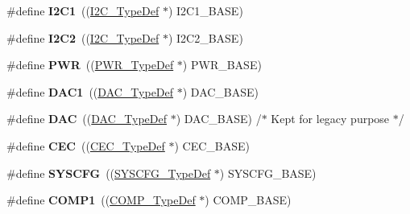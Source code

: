 \begin{DoxyCompactItemize}
\#define {\bfseries I2\+C1}~((\hyperlink{struct_i2_c___type_def}{I2\+C\+\_\+\+Type\+Def} $\ast$) I2\+C1\+\_\+\+B\+A\+SE)
\item 
\mbox{\label{group___peripheral__declaration_gafa60ac20c1921ef1002083bb3e1f5d16}} 
\#define {\bfseries I2\+C2}~((\hyperlink{struct_i2_c___type_def}{I2\+C\+\_\+\+Type\+Def} $\ast$) I2\+C2\+\_\+\+B\+A\+SE)
\item 
\mbox{\label{group___peripheral__declaration_ga04651c526497822a859942b928e57f8e}} 
\#define {\bfseries P\+WR}~((\hyperlink{struct_p_w_r___type_def}{P\+W\+R\+\_\+\+Type\+Def} $\ast$) P\+W\+R\+\_\+\+B\+A\+SE)
\item 
\mbox{\label{group___peripheral__declaration_gaffb5ff8779fa698f3c7165a617d56e4f}} 
\#define {\bfseries D\+A\+C1}~((\hyperlink{struct_d_a_c___type_def}{D\+A\+C\+\_\+\+Type\+Def} $\ast$) D\+A\+C\+\_\+\+B\+A\+SE)
\item 
\mbox{\label{group___peripheral__declaration_ga4aa2a4ab86ce00c23035e5cee2e7fc7e}} 
\#define {\bfseries D\+AC}~((\hyperlink{struct_d_a_c___type_def}{D\+A\+C\+\_\+\+Type\+Def} $\ast$) D\+A\+C\+\_\+\+B\+A\+SE) /$\ast$ Kept for legacy purpose $\ast$/
\item 
\mbox{\label{group___peripheral__declaration_ga7d03f4d873d59ff8bc76b6c9b576f3e3}} 
\#define {\bfseries C\+EC}~((\hyperlink{struct_c_e_c___type_def}{C\+E\+C\+\_\+\+Type\+Def} $\ast$) C\+E\+C\+\_\+\+B\+A\+SE)
\item 
\mbox{\label{group___peripheral__declaration_ga3c833fe1c486cb62250ccbca32899cb8}} 
\#define {\bfseries S\+Y\+S\+C\+FG}~((\hyperlink{struct_s_y_s_c_f_g___type_def}{S\+Y\+S\+C\+F\+G\+\_\+\+Type\+Def} $\ast$) S\+Y\+S\+C\+F\+G\+\_\+\+B\+A\+SE)
\item 
\mbox{\label{group___peripheral__declaration_gaf5713f83009027d48805b049d55bb01b}} 
\#define {\bfseries C\+O\+M\+P1}~((\hyperlink{struct_c_o_m_p___type_def}{C\+O\+M\+P\+\_\+\+Type\+Def} $\ast$) C\+O\+M\+P\+\_\+\+B\+A\+SE)
\item 
\mbox{\label{group___peripheral__declaration_ga6985fa7e9bb3c2edf15b29b7af210a2b}} 

\end{DoxyCompactItemize}
